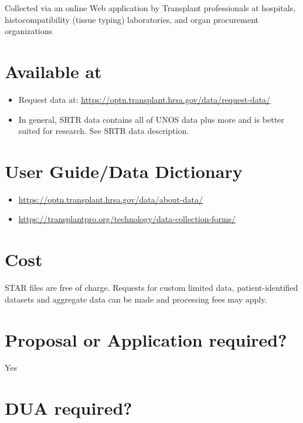 \documentclass[
]{book}
\providecommand{\tightlist}{%
  \setlength{\itemsep}{0pt}\setlength{\parskip}{0pt}}
\begin{document}
Collected via an online Web application by Transplant professionals at hospitals, histocompatibility (tissue typing) laboratories, and organ procurement organizations

\hypertarget{available-at-91}{%
\section{Available at}\label{available-at-91}}

\begin{itemize}
\tightlist
\item
  Request data at: \url{https://optn.transplant.hrsa.gov/data/request-data/}
\item
  In general, SRTR data contains all of UNOS data plus more and is better suited for research. See SRTR data description.
\end{itemize}

\hypertarget{user-guidedata-dictionary-91}{%
\section{User Guide/Data Dictionary}\label{user-guidedata-dictionary-91}}

\begin{itemize}
\tightlist
\item
  \url{https://optn.transplant.hrsa.gov/data/about-data/}
\item
  \url{https://transplantpro.org/technology/data-collection-forms/}
\end{itemize}

\hypertarget{cost-91}{%
\section{Cost}\label{cost-91}}

STAR files are free of charge. Requests for custom limited data, patient-identified datasets and aggregate data can be made and processing fees may apply.

\hypertarget{proposal-or-application-required-91}{%
\section{Proposal or Application required?}\label{proposal-or-application-required-91}}

Yes

\hypertarget{dua-required-91}{%
\section{DUA required?}\label{dua-required-91}}
\end{document}
